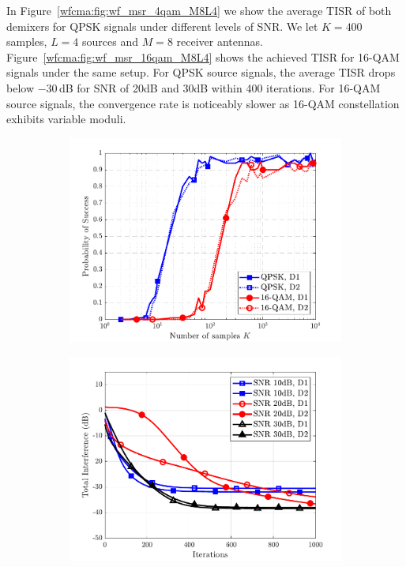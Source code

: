 In Figure~\ref{wfcma:fig:wf_msr_4qam_M8L4} we show the average TISR of both demixers for QPSK signals under different levels of SNR.  
We let $K=400$ samples, $L=4$ sources and $M=8$ receiver antennas. 
Figure~\ref{wfcma:fig:wf_msr_16qam_M8L4} shows the achieved TISR for 16-QAM signals under the same setup. 
For QPSK source signals, the average TISR drops below $-30\,$dB for SNR of 20dB and 30dB within 400 iterations. 
For 16-QAM source signals,  the convergence rate is noticeably slower as 16-QAM constellation exhibits variable moduli.
\begin{figure}
	\centering
	\begin{subfigure}[t]{0.32\textwidth}
		\includegraphics[width=\linewidth]{./figs/wfcma_figs/BF_WF_MSR_success_allmods_L=4_M=8_T=1000_mu=1e-3_gamma=1.pdf} 
		\label{wfcma:fig:wf_msr_success}
	\end{subfigure}\hfill
	\begin{subfigure}[t]{0.32\textwidth}
		\includegraphics[width=\linewidth]{./figs/wfcma_figs/BF_WF_MSR_TI_4QAM_L=4_M=8_J=2_K=400_2.pdf}	

\end{subfigure}
\end{figure}
